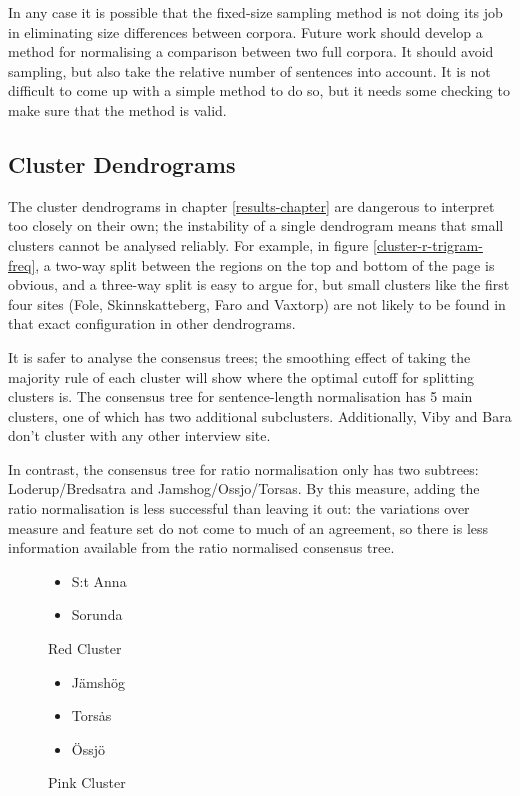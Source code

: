 In any case it is possible that the fixed-size sampling method is not doing its
job in eliminating size differences between corpora. Future work
should develop a method for normalising a comparison between two full
corpora. It should avoid sampling, but also take the relative number
of sentences into account. It is not difficult to come up
with a simple method to do so, but it needs some checking to make sure
that the method is valid.

\subsection{Cluster Dendrograms}

The cluster dendrograms in chapter \ref{results-chapter} are dangerous
to interpret too closely on their own; the instability of a single
dendrogram means that small clusters cannot be analysed reliably. For
example, in figure \ref{cluster-r-trigram-freq}, a two-way split
between the regions on the top and bottom of the page is
obvious, and a three-way split is easy to argue for, but small
clusters like the first four sites (Fole, Skinnskatteberg, Faro and
Vaxtorp) are not likely to be found in that exact configuration in
other dendrograms.

It is safer to analyse the consensus trees; the smoothing effect of
taking the majority rule of each cluster will show where the optimal
cutoff for splitting clusters is. The consensus tree for
sentence-length normalisation has 5 main clusters, one of which has
two additional subclusters. Additionally, Viby and Bara don't cluster
with any other interview site.

In contrast, the consensus tree for ratio normalisation only has two
subtrees: Loderup/Bredsatra and Jamshog/Ossjo/Torsas. By this measure,
adding the ratio normalisation is less successful than leaving it out:
the variations over measure and feature set do not come to much of an
agreement, so there is less information available from the ratio
normalised consensus tree.

\begin{figure}
\begin{itemize}
\item S:t Anna
\item Sorunda
\end{itemize}
\caption{Red Cluster}
\label{red-cluster}
\end{figure}

\begin{figure}
\begin{itemize}
\item J\"amsh\"og
\item Tors\.as
\item \"Ossj\"o
\end{itemize}
\caption{Pink Cluster}
\label{pink-cluster}
\end{figure}

